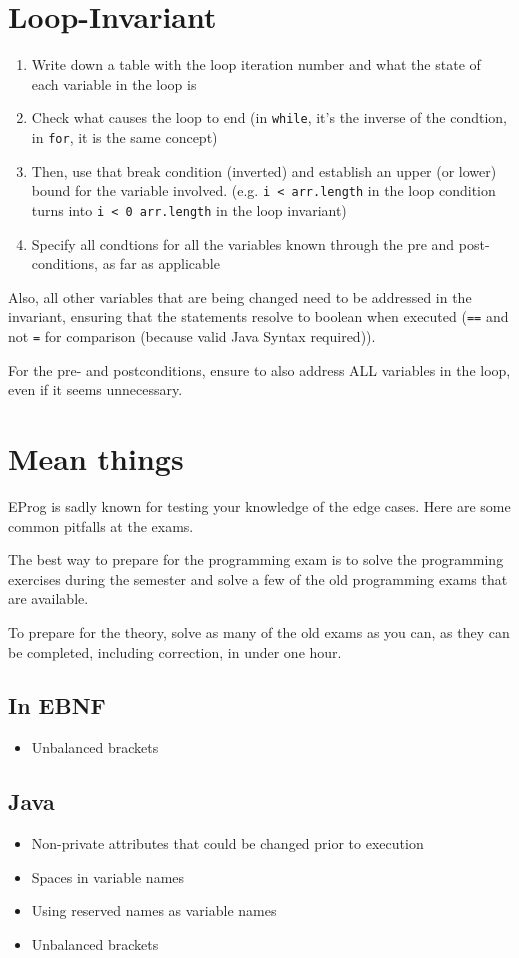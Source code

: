 \documentclass{article}
\begin{document}
\startDocument
\usetcolorboxes






\section{Loop-Invariant}
\begin{enumerate}
    \item Write down a table with the loop iteration number and what the state of each variable in the loop is
    \item Check what causes the loop to end (in \texttt{while}, it's the inverse of the condtion, in \texttt{for}, it is the same concept)
    \item Then, use that break condition (inverted) and establish an upper (or lower) bound for the variable involved. (e.g. \texttt{i < arr.length} in the loop condition turns into \texttt{i < 0 arr.length} in the loop invariant)
    \item Specify all condtions for all the variables known through the pre and post-conditions, as far as applicable
\end{enumerate}

Also, all other variables that are being changed need to be addressed in the invariant, ensuring that the statements resolve to boolean when executed
(\texttt{==} and not \texttt{=} for comparison (because valid Java Syntax required)).

For the pre- and postconditions, ensure to also address ALL variables in the loop, even if it seems unnecessary.


\section{Mean things}
EProg is sadly known for testing your knowledge of the edge cases. Here are some common pitfalls at the exams.

The best way to prepare for the programming exam is to solve the programming exercises during the semester and solve a few of the old programming exams that are available.

To prepare for the theory, solve as many of the old exams as you can, as they can be completed, including correction, in under one hour.


\subsection{In EBNF}
\begin{itemize}
    \item Unbalanced brackets
\end{itemize}

\subsection{Java}
\begin{itemize}
    \item Non-private attributes that could be changed prior to execution
    \item Spaces in variable names
    \item Using reserved names as variable names
    \item Unbalanced brackets
\end{itemize}
\end{document}
